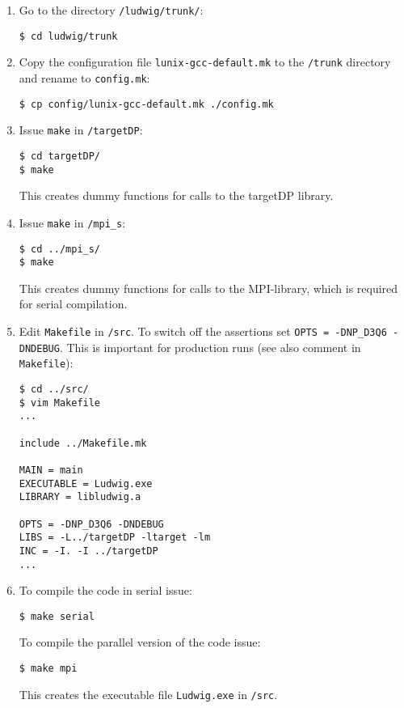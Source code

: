 \documentclass[11pt,twoside,a4paper]{article}
\begin{document}
\begin{enumerate}
\item Go to the directory \texttt{/ludwig/trunk/}: \\
\begin{lstlisting}
$ cd ludwig/trunk
\end{lstlisting}
\item Copy the configuration file \texttt{lunix-gcc-default.mk} to the \texttt{/trunk} directory 
and rename to \texttt{config.mk}: \\
\begin{lstlisting}
$ cp config/lunix-gcc-default.mk ./config.mk
\end{lstlisting}
\item Issue \texttt{make} in \texttt{/targetDP}: \\
\begin{lstlisting}
$ cd targetDP/
$ make 
\end{lstlisting}
This creates dummy functions for calls to the targetDP library.
\item Issue \texttt{make} in \texttt{/mpi\_s}: \\
\begin{lstlisting}
$ cd ../mpi_s/
$ make 
\end{lstlisting}
This creates dummy functions for calls to the MPI-library,
which is required for serial compilation.
\item Edit \texttt{Makefile} in \texttt{/src}. To switch off 
the assertions set \texttt{OPTS = -DNP\_D3Q6 -DNDEBUG}. This is
important for production runs (see also comment in \texttt{Makefile}): \\
\begin{lstlisting}
$ cd ../src/
$ vim Makefile
...

include ../Makefile.mk

MAIN = main
EXECUTABLE = Ludwig.exe
LIBRARY = libludwig.a

OPTS = -DNP_D3Q6 -DNDEBUG
LIBS = -L../targetDP -ltarget -lm
INC = -I. -I ../targetDP
...
\end{lstlisting}
\item To compile the code in serial issue: \\
\begin{lstlisting}
$ make serial
\end{lstlisting} 
To compile the parallel version of the code issue: \\
\begin{lstlisting}
$ make mpi
\end{lstlisting} 
This creates the executable file \texttt{Ludwig.exe} in \texttt{/src}.
\end{enumerate}



%
\end{document}
